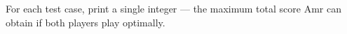 For each test case, print a single integer --- the maximum total score Amr can obtain if both players play optimally.